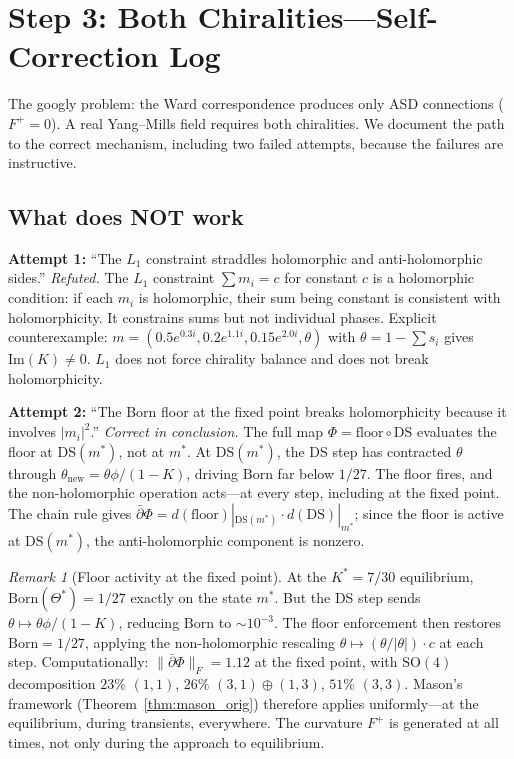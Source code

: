 \documentclass[11pt,a4paper]{article}
\theoremstyle{definition}
\theoremstyle{remark}
\newtheorem{remark}[theorem]{Remark}
\newcommand{\dbar}{\bar{\partial}}
\begin{document}
\section{Step 3: Both Chiralities---Self-Correction Log}\label{sec:googly}

The googly problem: the Ward correspondence produces only ASD connections ($F^+=0$). A real Yang--Mills field requires both chiralities. We document the path to the correct mechanism, including two failed attempts, because the failures are instructive.

\subsection{What does NOT work}

\textbf{Attempt 1:} ``The $L_1$ constraint straddles holomorphic and anti-holomorphic sides.'' \emph{Refuted.} The $L_1$ constraint $\sum m_i=c$ for constant $c$ is a holomorphic condition: if each $m_i$ is holomorphic, their sum being constant is consistent with holomorphicity. It constrains sums but not individual phases. Explicit counterexample: $m=(0.5e^{0.3i},0.2e^{1.1i},0.15e^{2.0i},\theta)$ with $\theta=1-\sum s_i$ gives $\mathrm{Im}(K)\neq 0$. $L_1$ does not force chirality balance and does not break holomorphicity.

\textbf{Attempt 2:} ``The Born floor at the fixed point breaks holomorphicity because it involves $|m_i|^2$.'' \emph{Correct in conclusion.} The full map $\Phi=\mathrm{floor}\circ\mathrm{DS}$ evaluates the floor at $\mathrm{DS}(m^*)$, not at $m^*$. At $\mathrm{DS}(m^*)$, the DS step has contracted $\theta$ through $\theta_{\mathrm{new}}=\theta\phi/(1-K)$, driving $\mathrm{Born}$ far below $1/27$. The floor fires, and the non-holomorphic operation acts---at every step, including at the fixed point. The chain rule gives $\dbar\Phi=d(\mathrm{floor})|_{\mathrm{DS}(m^*)}\cdot d(\mathrm{DS})|_{m^*}$; since the floor is active at $\mathrm{DS}(m^*)$, the anti-holomorphic component is nonzero.

\begin{remark}[Floor activity at the fixed point]\label{rem:floor_active}
At the $K^*=7/30$ equilibrium, $\mathrm{Born}(\Theta^*)=1/27$ exactly on the state $m^*$. But the DS step sends $\theta\mapsto\theta\phi/(1-K)$, reducing $\mathrm{Born}$ to $\sim 10^{-3}$. The floor enforcement then restores $\mathrm{Born}=1/27$, applying the non-holomorphic rescaling $\theta\mapsto(\theta/|\theta|)\cdot c$ at each step. Computationally: $\|\dbar\Phi\|_F=1.12$ at the fixed point, with $\mathrm{SO}(4)$ decomposition $23\%$ $(1,1)$, $26\%$ $(3,1)\oplus(1,3)$, $51\%$ $(3,3)$. Mason's framework (Theorem~\ref{thm:mason_orig}) therefore applies uniformly---at the equilibrium, during transients, everywhere. The curvature $F^+$ is generated at all times, not only during the approach to equilibrium.
\end{remark}
\end{document}
